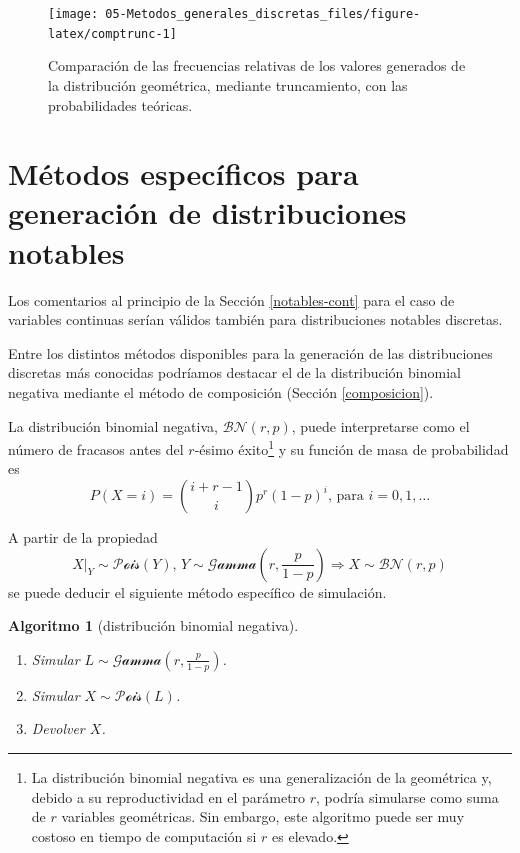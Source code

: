 \documentclass[
  10pt,
]{book}
\theoremstyle{break}
\newtheorem{conjecture}{Algoritmo}[chapter]
\theoremstyle{nonumberplain}
\let\oldfootnote\footnote
\renewcommand\footnote[1]{\oldfootnote{\hspace{2mm}#1}}
\begin{document}
\begin{figure}[!htbp]

{\centering \texttt{[image: 05-Metodos\_generales\_discretas\_files/figure-latex/comptrunc-1]} 

}

\caption{Comparación de las frecuencias relativas de los valores generados de la distribución geométrica, mediante truncamiento, con las probabilidades teóricas.}\label{fig:comptrunc}
\end{figure}

\hypertarget{notables-disc}{%
\section{Métodos específicos para generación de distribuciones notables}\label{notables-disc}}

Los comentarios al principio de la Sección \ref{notables-cont} para el caso de variables continuas serían válidos también para distribuciones notables discretas.

Entre los distintos métodos disponibles para la generación de las distribuciones discretas más conocidas podríamos destacar el de la distribución binomial negativa mediante el método de composición (Sección \ref{composicion}).

La distribución binomial negativa, \(\mathcal{BN}(r, p)\), puede interpretarse como el número de fracasos antes del \(r\)-ésimo éxito\footnote{La distribución binomial negativa es una generalización de la geométrica y, debido a su reproductividad en el parámetro \(r\), podría simularse como suma de \(r\) variables geométricas. Sin embargo, este algoritmo puede ser muy costoso en tiempo de computación si \(r\) es elevado.} y su función de masa de probabilidad es
\[P(X = i) = \binom{i+r-1}i p^r (1-p)^i \text{, para }i=0,1,\ldots\]

A partir de la propiedad \citep[ver e.g.][pp.~488-489]{devroye1986}
\[X|_{Y} \sim \mathcal{Pois}\left(  Y\right)  \text{, }Y \sim \mathcal{Gamma} \left( r, \frac{p}{1-p}\right)  \Rightarrow X \sim \mathcal{BN}(r, p)\]
se puede deducir el siguiente método específico de simulación.

\begin{conjecture}[distribución binomial negativa]
\protect\hypertarget{cnj:bin-neg}{}\label{cnj:bin-neg}

\begin{enumerate}
\def\labelenumi{\arabic{enumi}.}
\item
  Simular \(L \sim \mathcal{Gamma}\left( r, \frac{p}{1-p} \right)\).
\item
  Simular \(X \sim \mathcal{Pois} \left( L\right)\).
\item
  Devolver \(X\).
\end{enumerate}

\end{conjecture}
\end{document}
